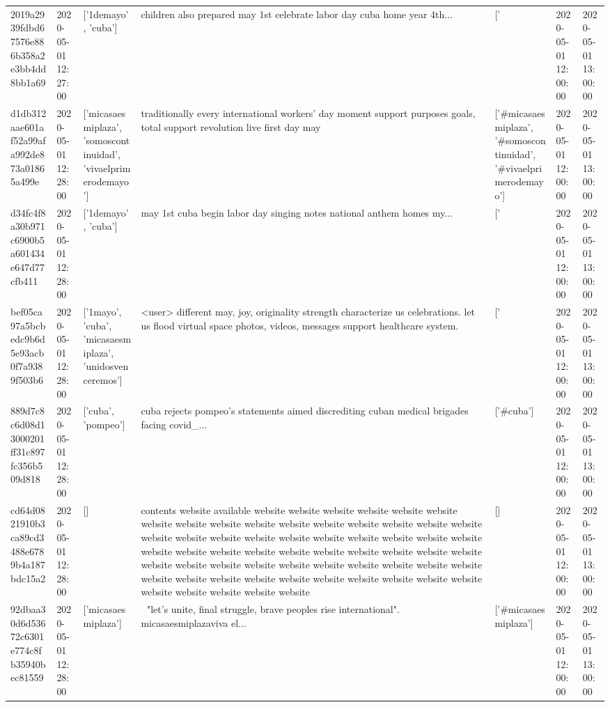\begin{tabular}{lllllll}
2019a2939fdbd67576e886b358a2e3bb4dd8bb1a69 & 2020-05-01 12:27:00 & ['1demayo', 'cuba'] & children also prepared may 1st celebrate labor day cuba home year 4th... & ['#1demayo', '#cuba'] & 2020-05-01 12:00:00 & 2020-05-01 13:00:00 \\
d1db312aae601af52a99afa992de873a01865a499e & 2020-05-01 12:28:00 & ['micasaesmiplaza', 'somoscontinuidad', 'vivaelprimerodemayo'] & traditionally every international workers' day moment support purposes goals, total support revolution live first day may & ['#micasaesmiplaza', '#somoscontinuidad', '#vivaelprimerodemayo'] & 2020-05-01 12:00:00 & 2020-05-01 13:00:00 \\
d34fc4f8a30b971c6900b5a601434e647d77cfb411 & 2020-05-01 12:28:00 & ['1demayo', 'cuba'] & may 1st cuba begin labor day singing notes national anthem homes my... & ['#1demayo', '#cuba'] & 2020-05-01 12:00:00 & 2020-05-01 13:00:00 \\
bef05ca97a5bcbedc9b6d5e93acb0f7a9389f503b6 & 2020-05-01 12:28:00 & ['1mayo', 'cuba', 'micasaesmiplaza', 'unidosvenceremos'] & <user> different may, joy, originality strength characterize us celebrations. let us flood virtual space photos, videos, messages support healthcare system. & ['#1mayo', '#cuba', '#micasaesmiplaza', '#unidosvenceremos'] & 2020-05-01 12:00:00 & 2020-05-01 13:00:00 \\
889d7c8c6d08d13000201ff31c897fc356b509d818 & 2020-05-01 12:28:00 & ['cuba', 'pompeo'] & cuba rejects pompeo's statements aimed discrediting cuban medical brigades facing covid\_... & ['#cuba'] & 2020-05-01 12:00:00 & 2020-05-01 13:00:00 \\
cd64d0821910b3ca89cd3488e6789b4a187bdc15a2 & 2020-05-01 12:28:00 & [] & contents website available website website website website website website website website website website website website website website website website website website website website website website website website website website website website website website website website website website website website website website website website website website website website website website website website website website website website website website website website website website website website website & [] & 2020-05-01 12:00:00 & 2020-05-01 13:00:00 \\
92dbaa30d6d53672c6301e774c8fb35940bec81559 & 2020-05-01 12:28:00 & ['micasaesmiplaza'] & 🎵 "let's unite, final struggle, brave peoples rise international". micasaesmiplazaviva el... & ['#micasaesmiplaza'] & 2020-05-01 12:00:00 & 2020-05-01 13:00:00 \\

\end{tabular}
